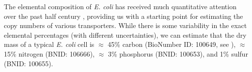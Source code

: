 The elemental composition of \textit{E. coli} has received much quantitative
attention over the past half century \citep{neidhardt1991, taymaz-nikerel2010,
heldal1985, bauer1976}, providing us with a starting point for estimating the
copy numbers of various transporters. While there is some variability in the
exact elemental percentages (with different uncertainties), we can estimate that
the dry mass of a typical \textit{E. coli} cell is $\approx$ 45\% carbon
(BioNumber ID: 100649, see ), $\approx$ 15\% nitrogen (BNID: 106666), $\approx$ 3\% phosphorus (BNID: 100653), and
1\% sulfur (BNID: 100655).



